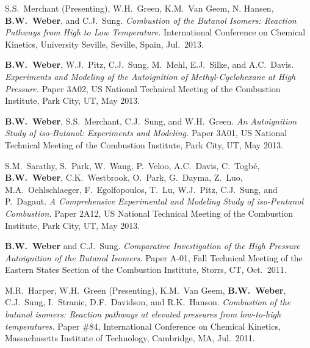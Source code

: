 \begin{bibmune}
\item S.S.\ Merchant (Presenting), W.H.\ Green, K.M.\ Van Geem, N.
        Hansen, \textbf{B.W.\ Weber}, and C.J.\ Sung.
        \textit{Combustion of the Butanol Isomers: Reaction Pathways
        from High to Low Temperature.}  International
        Conference on Chemical Kinetics, University Seville, Seville,
        Spain, Jul.\ 2013.

\item \textbf{B.W.\ Weber}, W.J.\ Pitz, C.J.\ Sung, M.\ Mehl,
        E.J.\ Silke, and A.C.\ Davis. \textit{Experiments and Modeling of
        the Autoignition of Methyl-Cyclohexane at High Pressure.}
        Paper 3A02,  US National Technical Meeting of the
        Combustion Institute, Park City, UT, May 2013.

\item \textbf{B.W.\ Weber}, S.S.\ Merchant, C.J.\ Sung, and W.H.\ Green.
        \textit{An Autoignition Study of iso-Butanol: Experiments and
        Modeling.} Paper 3A01,  US National Technical
        Meeting of the Combustion Institute, Park City, UT, May 2013.

\item S.M.\ Sarathy, S.\ Park, W.\ Wang, P.\ Veloo, A.C.\ Davis,
        C.\ Togbé, \textbf{B.W.\ Weber}, C.K.\ Westbrook, O.\ Park,
        G.\ Dayma, Z.\ Luo, M.A.\ Oehlschlaeger, F.\ Egolfopoulos, T.\ Lu,
        W.J.\ Pitz, C.J.\ Sung, and P.\ Dagaut. \textit{A Comprehensive
        Experimental and Modeling Study of iso-Pentanol Combustion.}
        Paper 2A12,  US National Technical Meeting of the
        Combustion Institute, Park City, UT, May 2013.

\item \textbf{B.W.\ Weber} and C.J.\ Sung. \textit{Comparative
        Investigation of the High Pressure Autoignition of the Butanol
        Isomers.} Paper A-01, Fall Technical Meeting of the Eastern
        States Section of the Combustion Institute, Storrs, CT, Oct.\
        2011.

\item M.R.\ Harper, W.H.\ Green (Presenting), K.M.\ Van Geem,
        \textbf{B.W.\ Weber}, C.J.\ Sung, I.\ Stranic, D.F.\ Davidson,
        and R.K.\ Hanson. \textit{Combustion of the butanol isomers:
        Reaction pathways at elevated pressures from low-to-high
        temperatures.} Paper \#84, \ordinalnum{7} International
        Conference on Chemical Kinetics, Massachusetts Institute of
        Technology, Cambridge, MA, Jul.\ 2011.


\end{bibmune}
